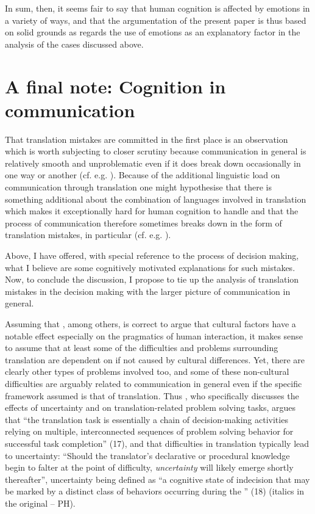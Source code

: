 \documentclass[output=paper]{LSP/langsci}
\begin{document}
In sum, then, it seems fair to say that human cognition is affected by emotions in a variety of ways, and that the argumentation of the present paper is thus based on solid grounds as regards the use of emotions as an explanatory factor in the analysis of the cases discussed above.

\section{A final note: Cognition in communication}\label{hietaranta:sec:6}

That translation mistakes are committed in the first place is an observation which is worth subjecting to closer scrutiny because communication in general is relatively smooth and unproblematic even if it does break down occasionally in one way or another (cf. e.g. \citealt{Bosco2006}). Because of the additional linguistic load on communication through translation one might hypothesise that there is something additional about the combination of languages involved in translation which makes it exceptionally hard for human cognition to handle and that the process of communication therefore sometimes breaks down in the form of translation mistakes, in particular (cf. e.g. \citealt[17]{Angelone2010}).

  Above, I have offered, with special reference to the process of decision making, what I believe are some cognitively motivated explanations for such mistakes. Now, to conclude the discussion, I propose to tie up the analysis of translation mistakes in the decision making  with the larger picture of communication in general.

  
  Assuming that \citet{Piller2010}, among others, is correct to argue that cultural factors have a notable effect especially on the pragmatics of human interaction, it makes sense to assume that at least some of the difficulties and problems surrounding translation are dependent on if not caused by cultural differences. Yet, there are clearly other types of problems involved too, and some of these non-cultural difficulties are arguably related to communication in general even if the specific framework assumed is that of translation. Thus \citet{Angelone2010}, who specifically discusses the effects of uncertainty and  on translation-related problem solving tasks, argues that ``the translation task is essentially a chain of decision-making activities relying on multiple, interconnected sequences of problem solving behavior for successful task completion'' (17), and that difficulties in translation typically lead to uncertainty: ``Should the translator's declarative or procedural knowledge begin to falter at the point of difficulty, \textit{uncertainty} will likely emerge shortly thereafter'', uncertainty being defined as ``a cognitive state of indecision that may be marked by a distinct class of behaviors occurring during the '' (18) (italics in the original -- PH).
\end{document}

